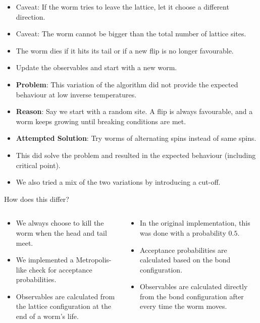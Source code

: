 \documentclass{beamer}
\begin{document}
\begin{frame}
\begin{itemize}
    \item Caveat: If the worm tries to leave the lattice, let it choose a different direction.
    \item Caveat: The worm cannot be bigger than the total number of lattice sites.
    \item The worm dies if it hits its tail or if a new flip is no longer favourable.
    \item Update the observables and start with a new worm.
\end{itemize}
\end{frame}

\begin{frame}
\begin{itemize}
    \item \textbf{Problem}: This variation of the algorithm did not provide the expected behaviour at low inverse temperatures.
    \item \textbf{Reason}: Say we start with a random site. A flip is always favourable, and a worm keeps growing until breaking conditions are met.
    \item \textbf{Attempted Solution}: Try worms of alternating spins instead of same spins.
    \item This did solve the problem and resulted in the expected behaviour (including critical point).
    \item We also tried a mix of the two variations by introducing a cut-off.
\end{itemize}
\end{frame}

\begin{frame}{How does this differ?}
\begin{columns}
    \begin{column}[t]{0.5\textwidth}
    \begin{itemize}
        \item We always choose to kill the worm when the head and tail meet.
        \item We implemented a Metropolis-like check for acceptance probabilities.
        \item Observables are calculated from the lattice configuration at the end of a worm's life.
    \end{itemize}
    \end{column}
    \begin{column}[t]{0.5\textwidth}
    \begin{itemize}
        \item In the original implementation, this was done with a probability $0.5$.
        \item Acceptance probabilities are calculated based on the bond configuration.
        \item Observables are calculated directly from the bond configuration after every time the worm moves.
    \end{itemize}
    \end{column}
\end{columns}
\end{frame}
\end{document}
